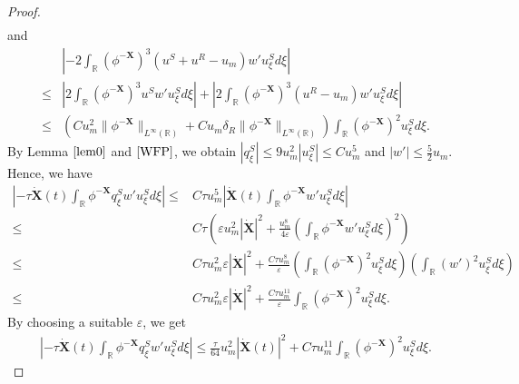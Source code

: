 \documentclass[10pt,reqno]{amsart}
\numberwithin{equation}{section}
\begin{document}
\begin{proof}
\begin{equation}
\begin{aligned}
			\end{aligned}
		\end{equation}
		and
		\begin{equation}\label{N5}
			\begin{aligned}
				&\left|-2\int_{\mathbb{R}}(\phi^{-\mathbf{X}})^3(u^S+u^R-u_{m})w'u_{\xi}^Sd\xi\right|\\
				\leq&\left|2\int_{\mathbb{R}}(\phi^{-\mathbf{X}})^3u^Sw'u_{\xi}^Sd\xi\right|+\left|2\int_{\mathbb{R}}(\phi^{-\mathbf{X}})^3(u^R-u_{m})w'u_{\xi}^Sd\xi\right|\\
				\leq&\left(C u_m^2\|\phi^{-\mathbf{X}}\|_{L^\infty(\mathbb{R})}+C u_m\delta_R\|\phi^{-\mathbf{X}}\|_{L^\infty(\mathbb{R})}\right)\int_{\mathbb{R}} (\phi^{-\mathbf{X}})^2 u_{\xi}^S d\xi.
			\end{aligned}
		\end{equation}
		By Lemma $\ref{lem0}$ and $\eqref{WFP}$, we obtain  $\left|q_{\xi}^S\right|\leq9u_m^2\left|u_{\xi}^S\right|\leq Cu_{m}^5$ and $\left|w'\right|\leq \frac{5}{2}u_m$. Hence, we have 
		\begin{equation*}
			\begin{aligned}
				\left|-\tau\dot{\mathbf{X}}(t)\int_{\mathbb{R}}\phi^{-\mathbf{X}}q_{\xi}^{S}w'u_{\xi}^{S}d\xi\right|
				\leq&C\tau u_m^5\left|\dot{{\mathbf{X}}}(t)\int_{\mathbb{R}}\phi^{-\mathbf{X}}w'u_{\xi}^Sd\xi\right|\\
				\leq&C\tau \left(\varepsilon u_{m}^2\left|\dot{\mathbf{X}}\right|^2+\frac{u_{m}^8}{4\varepsilon}\left(\int_{\mathbb{R}}\phi^{-\mathbf{X}}w'u_{\xi}^Sd\xi\right)^2\right)\\
				\leq&C\tau u_m^2\varepsilon\left|\dot{\mathbf{X}}\right|^2+\frac{C\tau u_m^8}{\varepsilon}\left(\int_{\mathbb{R}}(\phi^{-\mathbf{X}})^2u_{\xi}^Sd\xi\right)\left(\int_{\mathbb{R}}(w')^2u_{\xi}^Sd\xi\right)\\
				\leq&C\tau u_m^2\varepsilon\left|\dot{\mathbf{X}}\right|^2+\frac{C\tau u_m^{11}}{\varepsilon}\int_{\mathbb{R}}(\phi^{-\mathbf{X}})^2u_{\xi}^Sd\xi.
			\end{aligned}
		\end{equation*}
		By choosing a suitable $\varepsilon$, we get 
		\begin{equation}\label{N6}
			\begin{aligned}
				\left|-\tau\dot{\mathbf{X}}(t)\int_{\mathbb{R}}\phi^{-\mathbf{X}}q_{\xi}^{S}w'u_{\xi}^{S}d\xi\right|\leq \frac{\tau}{64}u_m^2\left|\dot{\mathbf{X}}(t)\right|^2+C\tau u_m^{11}\int_{\mathbb{R}}(\phi^{-\mathbf{X}})^2u_{\xi}^Sd\xi.
			\end{aligned}

\end{equation}
\end{proof}
\end{document}

